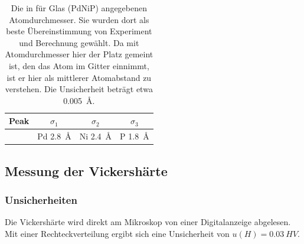 \documentclass[
	a4paper,
	12pt,
	pagesize,
	ngerman
]{scrartcl}
\begin{document}
	\begin{table}[H]
		\centering
		\begin{tabular}{ c | c | c | c }%
			 Peak&  $\sigma_1$ & $\sigma_2$ & $\sigma_3$\\ \hline
			  & Pd \SI{2.8}{\angstrom} & Ni \SI{2.4}{\angstrom} & P \SI{1.8}{\angstrom}
		\end{tabular}
		\caption{Die in \cite{SIETSMA1991146} für Glas (PdNiP) angegebenen Atomdurchmesser. Sie wurden dort als beste Übereinstimmung von Experiment und Berechnung gewählt. Da mit Atomdurchmesser hier der Platz gemeint ist, den das Atom im Gitter einnimmt, ist er hier als mittlerer Atomabstand zu verstehen. Die Unsicherheit beträgt etwa \SI{0.005}{\angstrom}.} %
		\label{tb_xrd_vgl}
\end{table}


	\subsection{Messung der Vickershärte}
	\subsubsection{Unsicherheiten} \label{sss_vicker_unsicher}
	Die Vickershärte wird direkt am Mikroskop von einer Digitalanzeige abgelesen.
	Mit einer Rechteckverteilung ergibt sich eine Unsicherheit von $u(H) = \SI{0.03}{HV}$.
\end{document}
